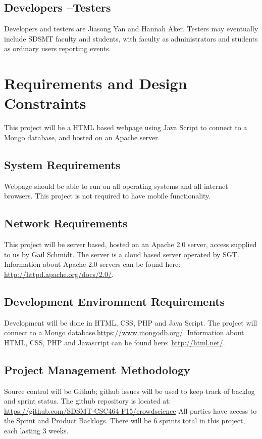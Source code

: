 \subsection{Developers --Testers}
Developers and testers are Jiasong Yan and Hannah Aker. Testers may eventually include SDSMT faculty and students, with faculty as administrators and students as ordinary users reporting events.

\section{Requirements and Design Constraints}

This project will be a HTML based webpage using Java Script to connect to a Mongo database, and hosted on an Apache server.

\subsection{System  Requirements}
Webpage should be able to run on all operating systems and all internet browsers. This project is not required to have mobile functionality.

\subsection{Network Requirements}
This project will be server based, hosted on an Apache 2.0 server, access supplied to us by Gail Schmidt. The server is a cloud based server operated by SGT. Information about Apache 2.0 servers can be found here: \url{http://httpd.apache.org/docs/2.0/}.

\subsection{Development Environment Requirements}
Development will be done in HTML, CSS, PHP and Java Script. The project will connect to a Mongo database.\url{https://www.mongodb.org/}. Information about HTML, CSS, PHP and Javascript can be found here: \url{http://html.net/}.

\subsection{Project  Management Methodology}
Source control will be Github; github issues will be used to keep track of backlog and sprint status. The github repository is located at: \url{https://github.com/SDSMT-CSC464-F15/crowdscience} All parties have access to the Sprint and Product Backlogs. There will be 6 sprints total in this project, each lasting 3 weeks.


